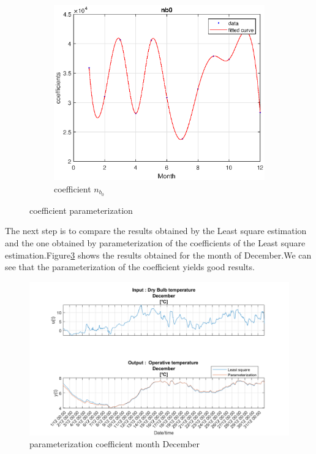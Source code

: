 \documentclass[a4paper,12pt]{report}
\numberwithin{equation}{section}
\begin{document}
\clearpage

\begin{figure}[H]\ContinuedFloat
\begin{subfigure}{\textwidth}
  \centering
  \includegraphics[width=.6\linewidth]{coeffnb0.eps}
  \caption{coefficient $n_{b_{0}}$}
  \label{fig:coeffnb0}
\end{subfigure}
\caption{coefficient parameterization}
\label{fig:fitcurves}
\end{figure}


\noindent
The next step is to compare the results obtained by the Least square estimation and the one obtained by parameterization of the coefficients of the Least square estimation.Figure\ref{fig:valparG2} shows the results obtained for the month of December.We can see that the parameterization of the coefficient yields good results.

\begin{figure}[H]
    \includegraphics[width=\textwidth]{val_par_G2.png}
    \centering
    \caption{parameterization coefficient month December}
    \label{fig:valparG2}
\end{figure}
\end{document}
